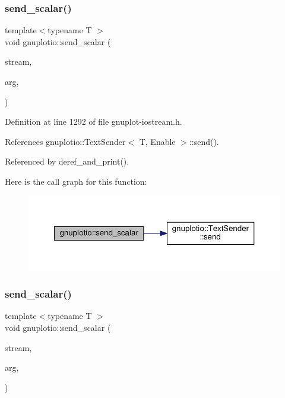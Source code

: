 \subsubsection{\texorpdfstring{send\+\_\+scalar()}{send\_scalar()}\hspace{0.1cm}{\footnotesize\ttfamily [1/3]}}
{\footnotesize\ttfamily template$<$typename T $>$ \\
void gnuplotio\+::send\+\_\+scalar (\begin{DoxyParamCaption}\item[{std\+::ostream \&}]{stream,  }\item[{const T \&}]{arg,  }\item[{\hyperlink{structgnuplotio_1_1_mode_text}{Mode\+Text}}]{ }\end{DoxyParamCaption})}



Definition at line 1292 of file gnuplot-\/iostream.\+h.



References gnuplotio\+::\+Text\+Sender$<$ T, Enable $>$\+::send().



Referenced by deref\+\_\+and\+\_\+print().

Here is the call graph for this function\+:\nopagebreak
\begin{figure}[H]
\begin{center}
\leavevmode
\includegraphics[width=350pt]{namespacegnuplotio_a55ff2f9abaa4b3e1c64a8f730f791b33_cgraph}
\end{center}
\end{figure}
\mbox{\label{namespacegnuplotio_a05022d6e136d8ed89a2bef0f61443332}} 
\subsubsection{\texorpdfstring{send\+\_\+scalar()}{send\_scalar()}\hspace{0.1cm}{\footnotesize\ttfamily [2/3]}}
{\footnotesize\ttfamily template$<$typename T $>$ \\
void gnuplotio\+::send\+\_\+scalar (\begin{DoxyParamCaption}\item[{std\+::ostream \&}]{stream,  }\item[{const T \&}]{arg,  }\item[{\hyperlink{structgnuplotio_1_1_mode_binary}{Mode\+Binary}}]{ }\end{DoxyParamCaption})}



